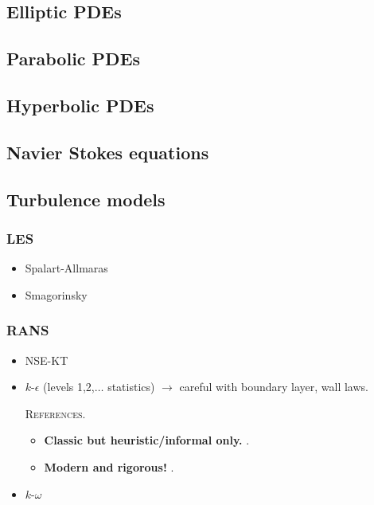 \documentclass{book}
\numberwithin{equation}{section}
\begin{document}
\subsection{Elliptic PDEs}

\subsection{Parabolic PDEs}

\subsection{Hyperbolic PDEs}

\subsection{Navier Stokes equations}


\subsection{Turbulence models}

\subsubsection{LES}
\begin{itemize}
    \item Spalart-Allmaras
    \item Smagorinsky
\end{itemize}

\subsubsection{RANS}
\begin{itemize}
    \item NSE-KT
    \item $k$-$\epsilon$ (levels 1,2,$\ldots$ statistics) $\to$ careful with boundary layer, wall laws.
    
    \textsc{References.}
    \begin{itemize}
        \item \textbf{Classic but heuristic/informal only.} \cite{Mohammadi_Pironneau1994}.
        \item \textbf{Modern and rigorous!} \cite{Rebollo_Lewandowski2014}.
    \end{itemize}
    \item $k$-$\omega$
\end{itemize}
\end{document}
